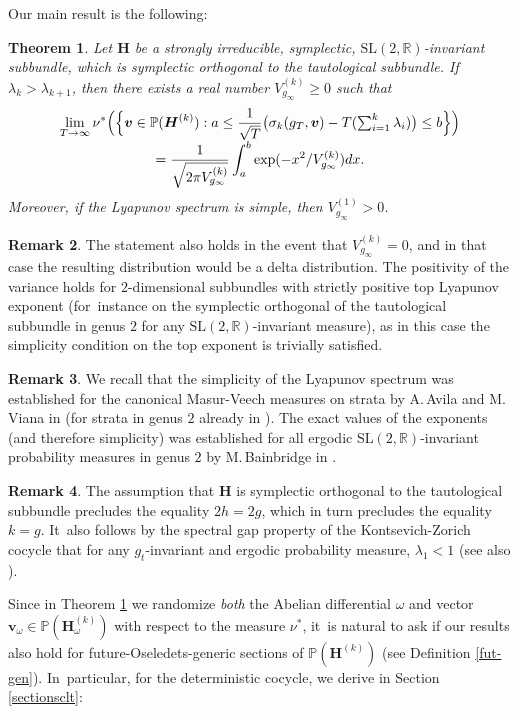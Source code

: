 \documentclass[10pt]{amsart}
\theoremstyle{plain}
\newtheorem{thm}{Theorem}[section]
\theoremstyle{definition}
\newtheorem{rem}[thm]{Remark}
\numberwithin{equation}{subsection}
\newcommand\bP{\mathbb{P}}
\newcommand\bR{\mathbb{R}}\let\R\bR
\newcommand{\SL}{\mathrm{SL}}
\newcommand{\bfH}{\boldsymbol{H}}
\newcommand{\bfv}{\boldsymbol{v}}
\begin{document}
Our main result is the following:
\begin{thm}\label{dclt}
Let $\bfH$ be a strongly irreducible, symplectic, $\SL(2,\R)$-invariant subbundle, which is symplectic orthogonal to the tautological subbundle. If $\lambda_k > \lambda_{k+1}$, then there exists a real number $V^{(k)}_{g_\infty} \geq 0$ such that\vspace*{-3pt}
\begin{multline*}
\lim_{T\to\infty}\nu^*\Bigl(\Bigl\{\bfv\in \bP(\bfH^{(k)}) :a \leq \frac{1}{\sqrt{T}} \bigl(\sigma_k(g_{T}, \bfv)- T(\textstyle\sum_{i=1}^k \lambda_i) \bigr) \leq b\Bigr\}\Bigr)\\[-3pt]
= \frac{1}{\sqrt{2\pi V^{(k)}_{g_\infty}}}\int_a^b\exp(-x^2/ V^{(k)}_{g_\infty})dx.
\end{multline*}
Moreover, if the Lyapunov spectrum is simple, then $V^{(1)}_{g_\infty} > 0$.
\end{thm}
\begin{rem}
The statement also holds in the event that $V^{(k)}_{g_\infty} = 0$, and in that case the resulting distribution would be a delta distribution. The positivity of the variance holds for $2$-dimensional subbundles with strictly positive top Lyapunov exponent (for~instance on the symplectic orthogonal of the tautological subbundle in genus $2$ for any $\SL(2,\R)$-invariant measure), as in this case the simplicity condition on the top exponent is trivially satisfied.
\end{rem}
\begin{rem}
We recall that the simplicity of the Lyapunov spectrum was established for the canonical Masur-Veech measures on strata by A.\,Avila and M.\,Viana in \cite{AV07} (for strata in genus $2$ already in \cite{For02}). The exact values of the exponents (and therefore simplicity) was established for all ergodic $\SL(2,\bR)$-invariant probability measures in genus $2$ by M.\,Bainbridge in \cite{B07}.
\end{rem}
\begin{rem}
The assumption that $\bfH$ is symplectic orthogonal to the tautological subbundle precludes the equality $2h=2g$, which in turn precludes the equality $k = g$. It~also follows by the spectral gap property of the Kontsevich-Zorich cocycle that for any $g_t$-invariant and ergodic probability measure, $\lambda_1<1$ \cite{For02} (see also \cite[Cor.\,2.2]{FMZ12}).
\end{rem}

Since in Theorem \ref{dclt} we randomize \emph{both} the Abelian differential $\omega$ and vector $\bfv_\omega \in \bP(\bfH_\omega^{(k)})$ with respect to the measure $\nu^*$, it~is natural to ask if our results also hold for future-Oseledets-generic sections of $\bP(\bfH^{(k)})$ (see Definition \ref{fut-gen}). In~particular, for the deterministic cocycle, we derive in Section \ref{sectionsclt}:
\end{document}

